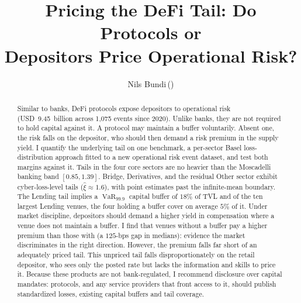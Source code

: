 \documentclass[runningheads]{llncs}
\newcommand{\VaR}{\operatorname{VaR}}
\begin{document}
\title{Pricing the DeFi Tail: Do Protocols or\\
Depositors Price Operational Risk?}
\author{Nils Bundi\,(\Envelope)}
\maketitle

\begin{abstract}
Similar to banks, DeFi protocols expose depositors to operational risk
(USD~9.45~billion across 1{,}075 events since 2020). Unlike banks, they
are not required to hold capital against it. A protocol may maintain a
buffer voluntarily. Absent one, the risk falls on the depositor, who
should then demand a risk premium in the supply yield. I quantify the underlying tail on one
benchmark, a per-sector Basel loss-distribution approach fitted to a
new operational risk event dataset, and test both margins against it. Tails
in the four core sectors are no heavier than the Moscadelli banking band
$[0.85, 1.39]$. Bridge, Derivatives, and the residual Other sector exhibit
cyber-loss-level tails ($\hat\xi \approx 1.6$), with point estimates past
the infinite-mean boundary. The Lending tail implies a $\VaR_{99.9}$ capital buffer of
$18\%$ of TVL and of the ten largest Lending venues,
the four holding a buffer cover on average $5\%$ of it.
Under market discipline, depositors should demand a higher yield in compensation where
a venue does not maintain a buffer. I find that venues without a buffer pay a higher premium than those with (a $125$-bps gap in medians): evidence the market discriminates in the right direction. However, the premium falls far short of an adequately priced tail. This unpriced tail falls disproportionately on the retail
depositor, who sees only the posted rate but lacks the information and skills 
to price it. Because these products are not bank-regulated, I recommend 
disclosure over capital mandates: protocols, and any service
providers that front access to it, should publish standardized
losses, existing capital buffers and tail coverage.
\end{abstract}
\end{document}
